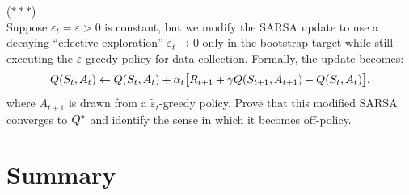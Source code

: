 \documentclass[11pt,a4paper]{article}
\begin{document}
\begin{exercise}
\textnormal{(\(***\))} \\
Suppose $\varepsilon_t = \varepsilon > 0$ is constant, but we
modify the SARSA update to use a decaying ``effective exploration''
$\tilde{\varepsilon}_t \to 0$ only in the bootstrap target while
still executing the $\varepsilon$-greedy policy for data collection.
Formally, the update becomes:
\[
  Q(S_t,A_t) \leftarrow Q(S_t,A_t)
  + \alpha_t\bigl[R_{t+1} + \gamma Q(S_{t+1}, \tilde{A}_{t+1})
  - Q(S_t,A_t)\bigr],
\]
where $\tilde{A}_{t+1}$ is drawn from a
$\tilde{\varepsilon}_t$-greedy policy. Prove that this modified
SARSA converges to $Q^*$ and identify the sense in which it
becomes off-policy.
\end{exercise}

\section{Summary}
\label{sec:summary}
\end{document}
